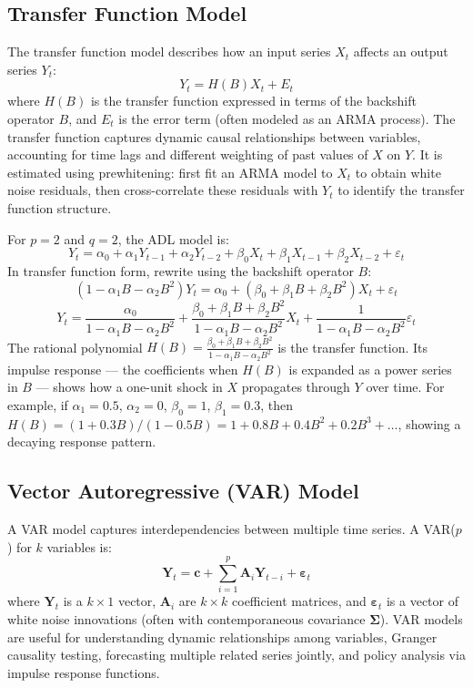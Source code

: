 \documentclass[11pt,a4paper]{article}
\begin{document}
\subsection{Transfer Function Model}

The transfer function model describes how an input series $X_t$ affects an output series $Y_t$:
\[
Y_t = H(B) X_t + E_t
\]
where $H(B)$ is the transfer function expressed in terms of the backshift operator $B$, and $E_t$ is the error term (often modeled as an ARMA process). The transfer function captures dynamic causal relationships between variables, accounting for time lags and different weighting of past values of $X$ on $Y$. It is estimated using prewhitening: first fit an ARMA model to $X_t$ to obtain white noise residuals, then cross-correlate these residuals with $Y_t$ to identify the transfer function structure.

\begin{tcolorbox}[colback=green!5!white,colframe=green!75!black,title=\textbf{Worked Example 15: ADL(2,2) Transfer Function Derivation}]
For $p=2$ and $q=2$, the ADL model is:
\[
Y_t = \alpha_0 + \alpha_1 Y_{t-1} + \alpha_2 Y_{t-2} + \beta_0 X_t + \beta_1 X_{t-1} + \beta_2 X_{t-2} + \varepsilon_t
\]
In transfer function form, rewrite using the backshift operator $B$:
\[
(1 - \alpha_1 B - \alpha_2 B^2) Y_t = \alpha_0 + (\beta_0 + \beta_1 B + \beta_2 B^2) X_t + \varepsilon_t
\]
\[
Y_t = \frac{\alpha_0}{1 - \alpha_1 B - \alpha_2 B^2} + \frac{\beta_0 + \beta_1 B + \beta_2 B^2}{1 - \alpha_1 B - \alpha_2 B^2} X_t + \frac{1}{1 - \alpha_1 B - \alpha_2 B^2} \varepsilon_t
\]
The rational polynomial $H(B) = \frac{\beta_0 + \beta_1 B + \beta_2 B^2}{1 - \alpha_1 B - \alpha_2 B^2}$ is the transfer function. Its impulse response --- the coefficients when $H(B)$ is expanded as a power series in $B$ --- shows how a one-unit shock in $X$ propagates through $Y$ over time. For example, if $\alpha_1 = 0.5$, $\alpha_2 = 0$, $\beta_0 = 1$, $\beta_1 = 0.3$, then $H(B) = (1 + 0.3B)/(1 - 0.5B) = 1 + 0.8B + 0.4B^2 + 0.2B^3 + \ldots$, showing a decaying response pattern.
\end{tcolorbox}

\subsection{Vector Autoregressive (VAR) Model}

A VAR model captures interdependencies between multiple time series. A VAR($p$) for $k$ variables is:
\[
\mathbf{Y}_t = \mathbf{c} + \sum_{i=1}^p \mathbf{A}_i \mathbf{Y}_{t-i} + \boldsymbol{\varepsilon}_t
\]
where $\mathbf{Y}_t$ is a $k \times 1$ vector, $\mathbf{A}_i$ are $k \times k$ coefficient matrices, and $\boldsymbol{\varepsilon}_t$ is a vector of white noise innovations (often with contemporaneous covariance $\mathbf{\Sigma}$). VAR models are useful for understanding dynamic relationships among variables, Granger causality testing, forecasting multiple related series jointly, and policy analysis via impulse response functions.
\end{document}
